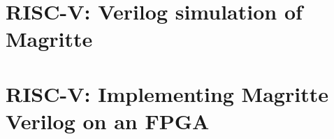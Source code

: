 \section{RISC-V: Verilog simulation of Magritte}

\label{Sec_FSMs_Magritte_simulation}


\section{RISC-V: Implementing Magritte Verilog on an FPGA}

\label{Sec_FSMs_Magritte_FPGA}

